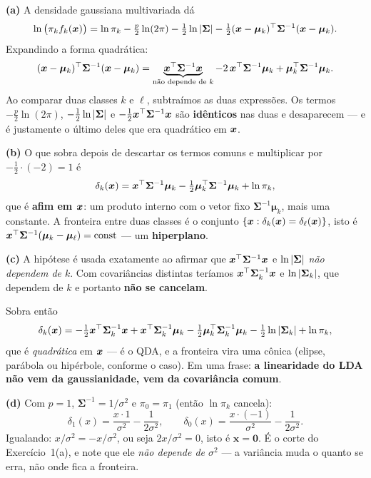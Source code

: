 \documentclass[11pt,a4paper]{article}
\begin{document}
\begin{solucao}
\textbf{(a)} A densidade gaussiana multivariada dá
\[
  \ln\big(\pi_k f_k(\bm{x})\big)
  = \ln\pi_k - \tfrac{p}{2}\ln(2\pi) - \tfrac12\ln\left\lvert \bm\Sigma \right\rvert
    - \tfrac12(\bm{x}-\bm\mu_k)^\top\bm\Sigma^{-1}(\bm{x}-\bm\mu_k).
\]
Expandindo a forma quadrática:
\[
  (\bm{x}-\bm\mu_k)^\top\bm\Sigma^{-1}(\bm{x}-\bm\mu_k)
  = \underbrace{\bm{x}^\top\bm\Sigma^{-1}\bm{x}}_{\text{não depende de }k}
    - 2\,\bm{x}^\top\bm\Sigma^{-1}\bm\mu_k
    + \bm\mu_k^\top\bm\Sigma^{-1}\bm\mu_k .
\]
Ao comparar duas classes $k$ e $\ell$, subtraímos as duas expressões. Os termos
$-\tfrac p2\ln(2\pi)$, $-\tfrac12\ln\left\lvert \bm\Sigma \right\rvert$ e
$-\tfrac12\bm{x}^\top\bm\Sigma^{-1}\bm{x}$ são \textbf{idênticos} nas duas e desaparecem
--- e é justamente o último deles que era quadrático em $\bm{x}$.

\smallskip
\textbf{(b)} O que sobra depois de descartar os termos comuns e multiplicar por
$-\tfrac12\cdot(-2)=1$ é
\[
  \delta_k(\bm{x}) = \bm{x}^\top\bm\Sigma^{-1}\bm\mu_k
    - \tfrac12\bm\mu_k^\top\bm\Sigma^{-1}\bm\mu_k + \ln\pi_k ,
\]
que é \textbf{afim em $\bm{x}$}: um produto interno com o vetor fixo
$\bm\Sigma^{-1}\bm\mu_k$, mais uma constante. A fronteira entre duas classes é o
conjunto $\{\bm{x}: \delta_k(\bm{x})=\delta_\ell(\bm{x})\}$, isto é
$\bm{x}^\top\bm\Sigma^{-1}(\bm\mu_k-\bm\mu_\ell) = \text{const}$ --- um
\textbf{hiperplano}.

\smallskip
\textbf{(c)} A hipótese é usada exatamente ao afirmar que
$\bm{x}^\top\bm\Sigma^{-1}\bm{x}$ e $\ln\left\lvert \bm\Sigma \right\rvert$ \emph{não dependem de $k$}. Com
covariâncias distintas teríamos $\bm{x}^\top\bm\Sigma_k^{-1}\bm{x}$ e
$\ln\left\lvert \bm\Sigma_k \right\rvert$, que dependem de $k$ e portanto \textbf{não se cancelam}.

Sobra então
\[
  \delta_k(\bm{x}) = -\tfrac12\bm{x}^\top\bm\Sigma_k^{-1}\bm{x}
    + \bm{x}^\top\bm\Sigma_k^{-1}\bm\mu_k
    - \tfrac12\bm\mu_k^\top\bm\Sigma_k^{-1}\bm\mu_k
    - \tfrac12\ln\left\lvert \bm\Sigma_k \right\rvert + \ln\pi_k ,
\]
que é \emph{quadrática} em $\bm{x}$ --- é o QDA, e a fronteira vira uma cônica
(elipse, parábola ou hipérbole, conforme o caso). Em uma frase: \textbf{a
linearidade do LDA não vem da gaussianidade, vem da covariância comum}.

\smallskip
\textbf{(d)} Com $p=1$, $\bm\Sigma^{-1}=1/\sigma^2$ e $\pi_0=\pi_1$ (então
$\ln\pi_k$ cancela):
\[
  \delta_1(x)=\frac{x\cdot 1}{\sigma^2}-\frac{1}{2\sigma^2},
  \qquad
  \delta_0(x)=\frac{x\cdot(-1)}{\sigma^2}-\frac{1}{2\sigma^2}.
\]
Igualando: $x/\sigma^2 = -x/\sigma^2$, ou seja $2x/\sigma^2=0$, isto é
$\mathbf{x=0}$. É o corte do Exercício~1(a), e note que ele \emph{não depende de
$\sigma^2$} --- a variância muda o quanto se erra, não onde fica a fronteira.
\end{solucao}
\end{document}
